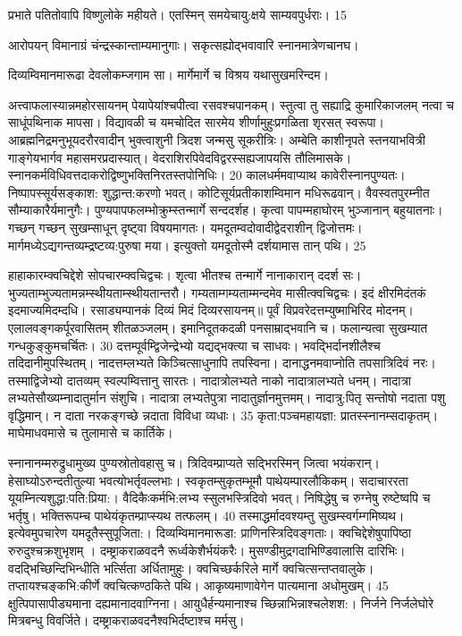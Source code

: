  प्रभाते पतितोवापि विष्णुलोके महीयते।
 एतस्मिन् समयेचायु:क्षये साम्यवपुर्धराः। 15 

 आरोपयन् विमानाग्रं चंन्द्रस्कान्ताम्यमानुगाः।
 सकृत्सह्योद्भवावारि स्नानमात्रेणचानघ।
 
 दिव्यम्विमानमारूढा देवलोकम्जगाम सा।
 मार्गेमार्गे च विश्रय यथासुखमरिन्दम।
 

अत्त्वाफलास्यान्नमहोरसायनम् पेयापेयांश्चपीत्वा रसवश्चपानकम्।
 स्तुत्वा तु सह्याद्रि कुमारिकाजलम् नत्वा च साधूंपथिनाक मापसा।
 विद्यावळी च यमचोदित सारमेय शीर्णामुहुःप्रगळिता शृरसत् स्वरूपा।
 आब्रह्मनिद्रमनुभूयदरौरवादीन् भुक्त्वाशुनी त्रिदश जन्मसु सूकरीत्रिः।
 अम्बेति काशीनृपते स्तनयाभवित्री गाङ्गेयभार्गव महासमरप्रदास्यात्।
 वेदराशिरपिवेदविद्वरस्सह्यजापयसि तौलिमासके।
 स्नानकर्मविधिवत्तदाकरोद्विष्णुभक्तिनिरतस्तपोनिधिः।
 20 कालधर्ममवाप्याथ कावेरीस्नानपुण्यतः।
 निष्पापस्सूर्यसङ्काश: शुद्धान्त:करणो भवत्।
 कोटिसूर्यप्रतीकाशम्विमान मधिरूढवान्।
 वैवस्वतपुरम्नीत सौम्याकारैर्यमानुगैः।
 पुण्यपापफलम्भोक्रुम्स्तन्मार्गे सन्ददर्शह।
 कृत्वा पापम्महाघोरम् भुञ्जानान् बहुयातनाः।
 गच्छन् गच्छन् सुखम्साधून् दृष्ट्वा विषयमागतः।
 यमदूतम्वदोवादीद्वेदराशीन् द्विजोत्तमः।
 मार्गमध्येऽद्यगन्तव्यम्द्रष्टव्य:पुरुषा मया।
 इत्युक्तो यमदूतोस्मै दर्शयामास तान् पथि।
 25

हाहाकारम्क्वचिद्देशे सोपचारम्क्वचिद्वचः।
 शृत्वा भीतश्च तन्मार्गे नानाकारान् ददर्श सः।
 भुज्यताम्भुज्यतामन्नम्स्थीयताम्स्थीयतान्तरौ।
 गम्यताम्गम्यताम्मन्दमेव मासीत्क्वचिद्वचः।
 इदं क्षीरमिदंतकं इदमाज्यमिदम्दधि।
 रसाड्यम्पानकं दिव्यं मिदं दिव्यरसायनम्॥ पूर्वं विप्रवरेदत्तम्युष्माभिरिद मोदनम्।
 एलालवङ्गकर्पूरवासितम् शीतळञ्जलम्।
 इमानिदूतकदळी पनसाम्राद्भवानि च।
 फलान्यत्वा सुखम्यात गन्धकुङ्कुमचर्चितः।
 30 दत्तम्पूर्वम्द्विजेन्द्रेभ्यो यद्यद्भक्त्या च साधवः।
 भवद्भिर्दानशीलैश्च तदिदानीमुपस्थितम्।
 नादत्तम्लभ्यते किञ्चित्साधुनापि तपस्विना।
 दानाद्धनमवाप्नोति तपसात्रिदिवं नरः।
 तस्माद्विजेभ्यो दातव्यम् स्वल्पम्वित्तानु सारतः।
 नादात्रोलभ्यते नाको नादात्रालभ्यते धनम्।
 नादात्रा लभ्यतेसौख्यम्नादातुर्मान संशुचि।
 नादात्रा लभ्यतेपुत्रा नादातुर्ज्ञानमुत्तमम्।
 नादात्रु:पितृ सन्तोषो नदाता पशु वृद्धिमान्।
 न दाता नरकङ्गच्छे न्नदाता विविधा व्यधाः।
 35 कृता:पञ्चमहायज्ञा: प्रातस्स्नानम्सदाकृतम्।
 माघेमाधवमासे च तुलामासे च कार्तिके।
 

स्नानानम्मरुद्रुधामुख्य पुण्यस्रोतोवहासु च।
 त्रिदिवम्प्राप्यते सद्भिरस्मिन् जित्वा भयंकरान्।
 हेसाघ्योऽरुन्दतीतुल्या भवत्योभर्तृवल्लभाः।
 स्वकृतम्सुकृतम्भूमौ पाथेयम्पारलौकिकम्।
 सदाचाररता यूयम्नित्यशुद्धा:पति:प्रिया:।
 वैदिकैःकर्मभि:लभ्य स्सुलभस्त्रिदिवो भवत्।
 निषिद्धेषु च रुग्नेषु रुष्टेष्वपि च भर्तृषु।
 भक्तिरूपम्च पाथेयंकृतम्प्राप्स्यथ तत्फलम्।
 40 तस्माद्धर्मादवश्यम्तु सुखम्स्वर्गम्गमिष्यथ।
 इत्येवमुपचारेण यमदूतैस्सुपूजिता:।
 दिव्यम्विमानमारूडा: प्राणिनस्त्रिदिवङ्गताः।
 क्वचिद्देशेषुपापिष्ठा रुरुदुश्चक्रशुभृशम् ।
 दम्ष्ट्राकराळवदनै रूर्ध्वकेशैर्भयंकरैः।
 मुसण्डीमुद्रगदाभिण्डिवालासि दारिभिः।
 वदद्भिच्छिन्दिभिन्धीति भर्त्सिता अर्धितामुहुः।
 क्वचिच्छर्करिले मार्गे क्वचित्सन्तप्तवालुके।
 तप्तायश्चङ्कभि:कीर्णे क्वचित्कण्ठकिते पथि।
 आकृष्यमाणावेगेन पात्यमाना अधोमुखम्।
 45 क्षुत्पिपासापीड्यमाना दह्यमानादवाग्निना।
 आयुधैर्हन्यमानाश्च च्छिन्नाभिन्नाश्चलेशश:।
 निर्जने निर्जलेघोरे मित्रबन्धु विवर्जिते।
 दम्ष्ट्राकराळवदनैश्वभिर्दष्टाश्च मर्मसु।
 

